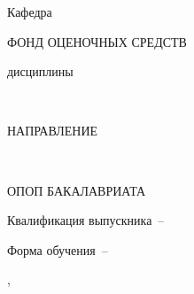 

\thispagestyle{empty}%
\begin{center}%
\MakeUppercase{\Ministry}
\end{center}%
%
\begin{center}%
\OrganizationNameFirst
\par
\OrganizationNameSecond
\end{center}%

\begin{center}%
Кафедра ~\AuthorDepartment
\end{center}%

\vspace{0pt plus32fill} 
\begin{center}%
{\large ФОНД ОЦЕНОЧНЫХ СРЕДСТВ}\par
дисциплины \par
\textbf{\DisciplineCode}~\MakeUppercase{\DisciplineName}
\end{center}%

\vspace{0pt plus6fill} 
\begin{center}%
{\large НАПРАВЛЕНИЕ}\par
\textbf{\SpecialityCode}~\MakeUppercase{\SpecialityName}
\end{center}%

\vspace{0pt plus6fill} 
\begin{center}%
{\large ОПОП БАКАЛАВРИАТА}\par
\MakeUppercase{\SpecialityOPOP}
\end{center}%

%
\vspace{0pt plus4fill} %
\begin{center}%
Квалификация выпускника~--~\Qualification\par
Форма обучения~--~\FormOfStudy
\end{center}%
%
\vspace{0pt plus4fill} 
\begin{center}%
{\MakeUppercase{\City},~\YearOfDocument}
\end{center}%
\newpage
